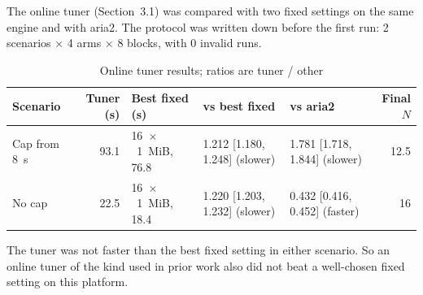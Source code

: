 The online tuner (Section~3.1) was compared with two fixed settings on the same engine and with aria2. The protocol was written down before the first run: 2 scenarios $\times$ 4 arms $\times$ 8 blocks, with 0 invalid runs.


\begin{table}[H]\centering
\caption{Online tuner results; ratios are tuner / other}\label{tab:tuner}
\small
\begin{tabularx}{\linewidth}{@{}lrlLLr@{}}
\toprule
\textbf{Scenario} & \textbf{Tuner (s)} & \textbf{Best fixed (s)} & \textbf{vs best fixed} & \textbf{vs aria2} & \textbf{Final $N$}\\
\midrule
Cap from 8~s & 93.1 & 16~$\times$~1~MiB, 76.8 & 1.212 [1.180, 1.248] (slower) & 1.781 [1.718, 1.844] (slower) & 12.5\\
No cap & 22.5 & 16~$\times$~1~MiB, 18.4 & 1.220 [1.203, 1.232] (slower) & 0.432 [0.416, 0.452] (faster) & 16\\
\bottomrule
\end{tabularx}
\end{table}
The tuner was not faster than the best fixed setting in either scenario. So an online tuner of the kind used in prior work also did not beat a well-chosen fixed setting on this platform.

